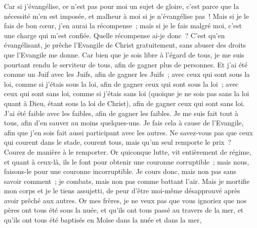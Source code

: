 \begin{multicols}{2}
Car si j'évangélise, ce n'est pas pour moi un sujet de gloire, c'est parce que la nécessité m'en est imposée, et malheur à moi si je n'évangélise pas~!
Mais si je le fais de bon cœur, j'en aurai la récompense~; mais si je le fais malgré moi, c'est une charge qui m'est confiée.
Quelle récompense ai-je donc~? C'est qu'en évangélisant, je prêche l'Evangile de Christ gratuitement, sans abuser des  droits que l'Evangile me donne.
Car bien que je sois libre à l'égard de tous, je me suis pourtant rendu le serviteur de tous, afin de gagner plus de personnes.
Et j'ai été comme un Juif avec les Juifs, afin de gagner les Juifs~; avec ceux qui sont sous la loi, comme si j'étais sous la loi, afin de gagner ceux qui sont sous la loi~;
avec ceux qui sont sans loi, comme si j'étais sans loi (quoique je ne sois pas sans la loi quant à Dieu, étant sous la loi de Christ), afin de gagner ceux qui sont sans loi.
J'ai été faible avec les faibles, afin de gagner les faibles. Je me suis fait tout à tous, afin d'en sauver au moins quelques-uns.
Je fais cela à cause de l'Evangile, afin que j'en sois fait aussi participant avec les autres.
Ne savez-vous pas que ceux qui courent dans le stade, courent tous, mais qu'un seul remporte le prix~? Courez de manière à le remporter.
Or quiconque lutte, vit entièrement de régime, et quant à ceux-là, ils le font pour obtenir une couronne corruptible~; mais nous, faisons-le pour une couronne incorruptible.
Je cours donc, mais non pas sans savoir comment~; je combats, mais non pas comme battant l'air.
Mais je mortifie mon corps et je le tiens assujetti, de peur d'être moi-même désapprouvé après avoir prêché aux autres.
\VerseOne{}Or mes frères, je ne veux pas que vous ignoriez que nos pères ont tous été sous la nuée, et qu'ils ont tous passé au travers de la mer,
et qu'ils ont tous été baptisés en Moïse dans la nuée et dans la mer,

\end{multicols}
